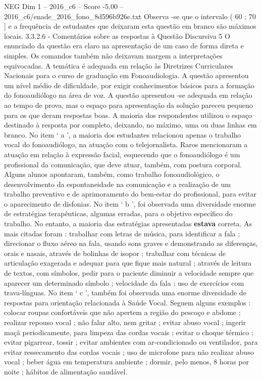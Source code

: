\begin{textsample}{NEG Dim 1 – 2016\_c6 – Score -5.00 – 2016\_c6/enade\_2016\_fono\_8d596b926e.txt}
Observa -se que o intervalo ( 60 ; 70 ] e a frequência de estudantes que deixaram esta questão em branco são máximos locais. 3.3.2.6 - Comentários sobre as respostas à Questão Discursiva 5 O enunciado da questão era claro na apresentação de um caso de forma direta e simples.
Os comandos também não deixavam margem a interpretações equivocadas.
A temática é adequada em relação às Diretrizes Curriculares Nacionais para o curso de graduação em Fonoaudiologia.
A questão apresentou um nível médio de dificuldade, por exigir conhecimentos básicos para a formação do fonoaudiólogo na área de voz.
A questão apresentou -se adequada em relação ao tempo de prova, mas o espaço para apresentação da solução pareceu pequeno para os que deram respostas boas.
A maioria dos respondentes utilizou o espaço destinado à resposta por completo, deixando, no máximo, uma ou duas linhas em branco.
No item ‘ a ’, a maioria dos estudantes relacionou apenas o trabalho vocal do fonoaudiólogo, na atuação com o telejornalista.
Raros mencionaram a atuação em relação à expressão facial, esquecendo que o fonoaudiólogo é um profissional da comunicação, que deve atuar, também, com postura corporal.
Alguns alunos apontaram, também, como trabalho fonoaudiológico, o desenvolvimento da espontaneidade na comunicação e a realização de um trabalho preventivo e de aprimoramento do bem-estar do profissional, para evitar o aparecimento de disfonias.
No item ‘ b ’, foi observada uma diversidade enorme de estratégias terapêuticas, algumas erradas, para o objetivo específico do trabalho.
No entanto, a maioria das estratégias apresentadas \textbf{estava} correta.
As mais citadas foram : trabalhar com letras de música, para identificar a fala ; direcionar o fluxo aéreo na fala, usando sons graves e demonstrando as diferenças, orais e nasais, através de bolinhas de isopor ; trabalhar com técnicas de articulação exagerada e adequar para que fique mais natural ; através de leitura de textos, com símbolos, pedir para o paciente diminuir a velocidade sempre que aparecer um determinado símbolo ; velocidade da fala : uso de exercícios com trava-línguas.
No item ‘ c ’, também foi observada uma enorme diversidade de respostas para orientação relacionada à Saúde Vocal.
Seguem alguns exemplos : colocar roupas confortáveis que não apertem a região do pescoço e abdome ; realizar repouso vocal ; não falar alto, nem gritar ; evitar abuso vocal ; ingerir maçã periodicamente, para limpeza das cordas vocais ; evitar o choque térmico ; evitar pigarrear, tossir ; evitar ambientes com ar-condicionado ou ventilador, para evitar ressecamento das cordas vocais ; uso de microfone para não realizar abuso vocal ; beber água em temperatura ambiente ; dormir, pelo menos, 8 horas por noite ; hábitos de alimentação saudável.

\end{textsample}
